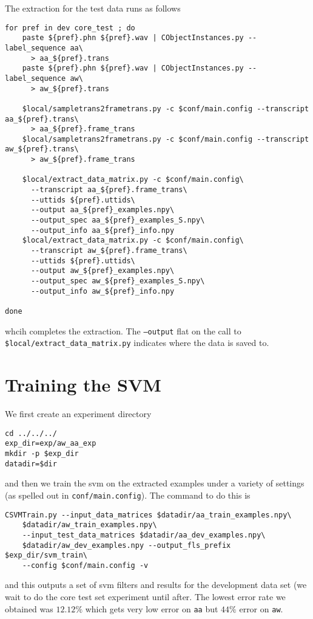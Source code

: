 \documentclass{article}
\begin{document}
The extraction for the test data runs as follows
\begin{verbatim}
for pref in dev core_test ; do
    paste ${pref}.phn ${pref}.wav | CObjectInstances.py --label_sequence aa\
      > aa_${pref}.trans
    paste ${pref}.phn ${pref}.wav | CObjectInstances.py --label_sequence aw\
      > aw_${pref}.trans

    $local/sampletrans2frametrans.py -c $conf/main.config --transcript aa_${pref}.trans\
      > aa_${pref}.frame_trans
    $local/sampletrans2frametrans.py -c $conf/main.config --transcript aw_${pref}.trans\
      > aw_${pref}.frame_trans

    $local/extract_data_matrix.py -c $conf/main.config\
      --transcript aa_${pref}.frame_trans\
      --uttids ${pref}.uttids\
      --output aa_${pref}_examples.npy\
      --output_spec aa_${pref}_examples_S.npy\
      --output_info aa_${pref}_info.npy
    $local/extract_data_matrix.py -c $conf/main.config\
      --transcript aw_${pref}.frame_trans\
      --uttids ${pref}.uttids\
      --output aw_${pref}_examples.npy\
      --output_spec aw_${pref}_examples_S.npy\
      --output_info aw_${pref}_info.npy

done
\end{verbatim}
whcih completes the extraction.  The \texttt{--output} flat on the
call to \texttt{\$local/extract\_data\_matrix.py} indicates
where the data is saved to.

\section{Training the SVM}

We first create an experiment directory
\begin{verbatim}
cd ../../../
exp_dir=exp/aw_aa_exp
mkdir -p $exp_dir
datadir=$dir
\end{verbatim}
and then we train the svm on the extracted examples
under a variety of settings (as spelled out in \texttt{conf/main.config}).  The command to do this is
\begin{verbatim}
CSVMTrain.py --input_data_matrices $datadir/aa_train_examples.npy\
    $datadir/aw_train_examples.npy\
    --input_test_data_matrices $datadir/aa_dev_examples.npy\
    $datadir/aw_dev_examples.npy --output_fls_prefix $exp_dir/svm_train\
    --config $conf/main.config -v
\end{verbatim}
and this outputs a set of svm filters and results for the development
data set (we wait to do the core test set experiment until after.
The lowest error rate we obtained was $12.12\%$ which gets very
low error on \texttt{aa} but $44\%$ error on \texttt{aw}.
\end{document}
